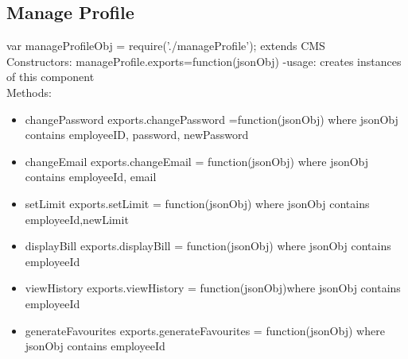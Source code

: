 \documentclass[a4paper,12pt]{article}
\begin{document}
 
\subsection{Manage Profile}
var manageProfileObj = require('./manageProfile');
extends CMS
\\
Constructors: 
 	manageProfile.exports=function(jsonObj){}
	-usage: creates instances of this component
\\
Methods:
\begin{itemize}
\item changePassword
        exports.changePassword =function(jsonObj){} where jsonObj contains employeeID, password, newPassword
\item changeEmail
	exports.changeEmail = function(jsonObj){} where jsonObj contains employeeId, email
\item setLimit
	exports.setLimit = function(jsonObj){} where jsonObj contains employeeId,newLimit
\item displayBill
	exports.displayBill = function(jsonObj){} where jsonObj contains employeeId
\item viewHistory
	exports.viewHistory = function(jsonObj){}where jsonObj contains employeeId
\item generateFavourites
	exports.generateFavourites = function(jsonObj){} where jsonObj contains employeeId
\end{itemize}
\end{document}
